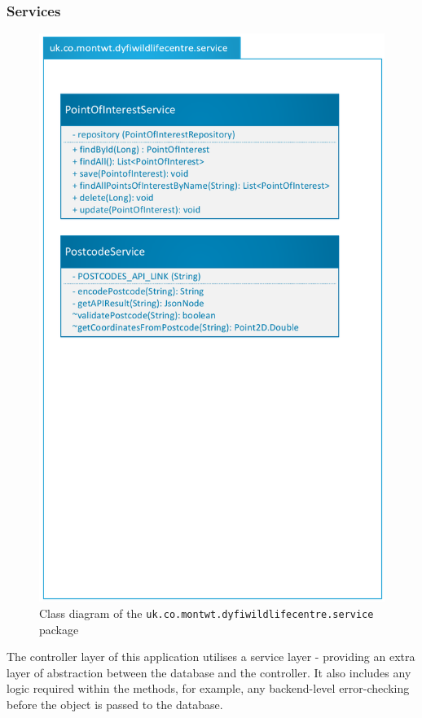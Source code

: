 \subsubsection{Services}
\label{geocoding}
\begin{figure}[H]
	\includegraphics[scale=0.7]{diagrams/modelservice}
	\caption{Class diagram of the \texttt{uk.co.montwt.dyfiwildlifecentre.service} package}
\end{figure}	

The controller layer of this application utilises a service layer - providing an extra layer of abstraction between the database and the controller. It also includes any logic required within the methods, for example, any backend-level error-checking before the object is passed to the database.

